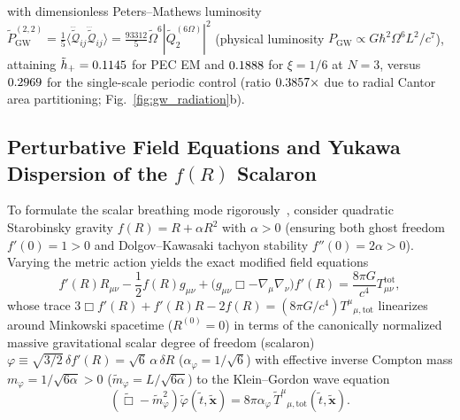 \documentclass[aps,prd,twocolumn,10pt,showkeys,nofootinbib,floatfix,longbibliography]{revtex4-2}
\begin{document}
with dimensionless Peters--Mathews luminosity $\tilde{P}_{\mathrm{GW}}^{(2,2)} = \frac{1}{5}\langle \dddot{\tilde{\mathcal{Q}}}_{ij}\dddot{\tilde{\mathcal{Q}}}_{ij}\rangle = \frac{93312}{5}\tilde{\Omega}^6 |\tilde{Q}_2^{(6\Omega)}|^2$ (physical luminosity $P_{\mathrm{GW}} \propto G \hbar^2 \Omega^6 L^2 / c^7$), attaining $\tilde{h}_+ = 0.1145$ for PEC EM and $0.1888$ for $\xi = 1/6$ at $N=3$, versus $0.2969$ for the single-scale periodic control (ratio $0.3857\times$ due to radial Cantor area partitioning; Fig.~\ref{fig:gw_radiation}b).

\subsection{Perturbative Field Equations and Yukawa Dispersion of the \texorpdfstring{$f(R)$}{f(R)} Scalaron}
To formulate the scalar breathing mode rigorously~\cite{starobinsky1980,defelice2010,berry2011,pourhassan2025epjc}, consider quadratic Starobinsky gravity $f(R) = R + \alpha R^2$ with $\alpha > 0$ (ensuring both ghost freedom $f'(0) = 1 > 0$ and Dolgov--Kawasaki tachyon stability $f''(0) = 2\alpha > 0$). Varying the metric action yields the exact modified field equations~\cite{defelice2010,pourhassan2025epjc}
\begin{equation}
f'(R)R_{\mu\nu} - \frac{1}{2}f(R)g_{\mu\nu} + \bigl(g_{\mu\nu}\Box - \nabla_\mu\nabla_\nu\bigr)f'(R) = \frac{8\pi G}{c^4} T_{\mu\nu}^{\mathrm{tot}},
\label{eq:fr_exact_eom}
\end{equation}
whose trace $3\Box f'(R) + f'(R)R - 2f(R) = (8\pi G/c^4)T^\mu{}_{\mu,\mathrm{tot}}$ linearizes around Minkowski spacetime ($R^{(0)} = 0$) in terms of the canonically normalized massive gravitational scalar degree of freedom (scalaron) $\varphi \equiv \sqrt{3/2}\,\delta f'(R) = \sqrt{6}\,\alpha\,\delta R$ ($\alpha_\varphi = 1/\sqrt{6}$) with effective inverse Compton mass $m_\varphi = 1/\sqrt{6\alpha} > 0$ ($\tilde{m}_\varphi = L/\sqrt{6\alpha}$) to the Klein--Gordon wave equation
\begin{equation}
\left(\tilde{\Box} - \tilde{m}_\varphi^2\right)\tilde{\varphi}(\tilde{t}, \tilde{\mathbf{x}}) = 8\pi\alpha_\varphi \, \tilde{T}^\mu{}_{\mu,\mathrm{tot}}(\tilde{t}, \tilde{\mathbf{x}}).
\label{eq:scalaron_wave_eq}
\end{equation}
\end{document}
